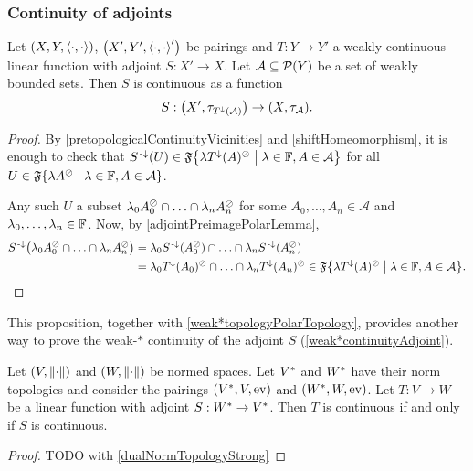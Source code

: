 \subsubsection{Continuity of adjoints}
\begin{proposition}
Let $\sSet{X,Y,\pair{\cdot,\cdot}}$, $\sSet{X',Y',\pair{\cdot,\cdot}'}$ be pairings and $T: Y\to Y'$ a weakly continuous linear function with adjoint $S: X'\to X$. Let $\mathcal{A}\subseteq\operatorname{\mathcal{P}}(Y)$ be a set of weakly bounded sets. Then $S$ is continuous as a function
\[ S: \sSet{X',\polarTop{T^\imf(\mathcal{A})}} \to \sSet{X, \polarTop{\mathcal{A}}}. \]
\end{proposition}
\begin{proof}
By \ref{pretopologicalContinuityVicinities} and \ref{shiftHomeomorphism}, it is enough to check that $S^\preimf(U)\in \mathfrak{F}\setbuilder{\lambda T^\imf(A)^\pol}{\lambda\in \F, A\in \mathcal{A}}$ for all $U \in \mathfrak{F}\setbuilder{\lambda A^\pol}{\lambda\in \F, A\in \mathcal{A}}$.

Any such $U$ a subset $\lambda_0 A_0^\oslash \cap \ldots \cap \lambda_n A_n^\oslash$ for some $A_0,\ldots, A_n\in \mathcal{A}$ and $\lambda_0,\ldots, \lambda_n\in \mathbb{F}$. Now, by \ref{adjointPreimagePolarLemma},
\begin{align*}
S^\preimf\big(\lambda_0 A_0^\pol \cap \ldots \cap \lambda_n A_n^\pol\big) &= \lambda_0 S^\preimf(A_0^\pol) \cap \ldots \cap \lambda_n S^\preimf(A_n^\pol) \\
&= \lambda_0 T^\imf(A_0)^\pol \cap \ldots \cap \lambda_n T^\imf(A_n)^\pol \in \mathfrak{F}\setbuilder{\lambda T^\imf(A)^\pol}{\lambda\in \F, A\in \mathcal{A}}.
\end{align*}
\end{proof}
This proposition, together with \ref{weak*topologyPolarTopology}, provides another way to prove the weak-$*$ continuity of the adjoint $S$ (\ref{weak*continuityAdjoint}).
\begin{corollary}
Let $\sSet{V,\norm{\cdot}}$ and $\sSet{W,\norm{\cdot}}$ be normed spaces. Let ${V}^*$ and ${W}^*$ have their norm topologies and consider the pairings $\sSet{\dual{V}, V, \evalMap}$ and $\sSet{\dual{W}, W, \evalMap}$. Let $T: V\to W$ be a linear function with adjoint $S: {W}^* \to {V}^*$. Then $T$ is continuous \textup{if and only if} $S$ is continuous.
\end{corollary}
\begin{proof}
TODO with \ref{dualNormTopologyStrong}
\end{proof}


